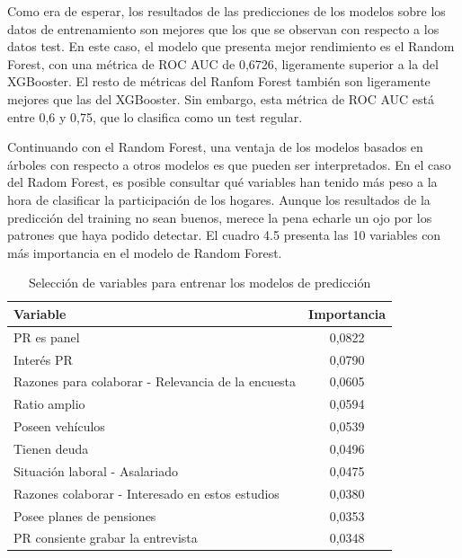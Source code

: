 Como era de esperar, los resultados de las predicciones de los modelos sobre los datos de entrenamiento son mejores que los que se observan con respecto a los datos test. En este caso, el modelo que presenta mejor rendimiento es el Random Forest, con una métrica de ROC AUC de 0,6726, ligeramente superior a la del XGBooster. El resto de métricas del Ranfom Forest también son ligeramente mejores que las del XGBooster. Sin embargo, esta métrica de ROC AUC está entre 0,6 y 0,75, que lo clasifica como un test regular.

Continuando con el Random Forest, una ventaja de los modelos basados en árboles con respecto a otros modelos es que pueden ser interpretados. En el caso del Radom Forest, es posible consultar qué variables han tenido más peso a la hora de clasificar la participación de los hogares. Aunque los resultados de la predicción del training no sean buenos, merece la pena echarle un ojo por los patrones que haya podido detectar. El cuadro 4.5 presenta las 10 variables con más importancia en el modelo de Random Forest.

\begin{table}[ht]
    \centering
    \begin{tabular}{lc}
    \hline
        \textbf{Variable} & \textbf{Importancia} \\ \hline
        PR es panel & 0,0822 \\ 
        Interés PR & 0,0790 \\ 
        Razones para colaborar - Relevancia de la encuesta & 0,0605 \\ 
        Ratio amplio & 0,0594 \\ 
        Poseen vehículos & 0,0539 \\ 
        Tienen deuda & 0,0496 \\ 
        Situación laboral - Asalariado & 0,0475 \\ 
        Razones colaborar - Interesado en estos estudios & 0,0380 \\ 
        Posee planes de pensiones & 0,0353 \\ 
        PR consiente grabar la entrevista & 0,0348 \\ \hline
    \end{tabular}
    \caption{Selección de variables para entrenar los modelos de predicción}
\end{table}

